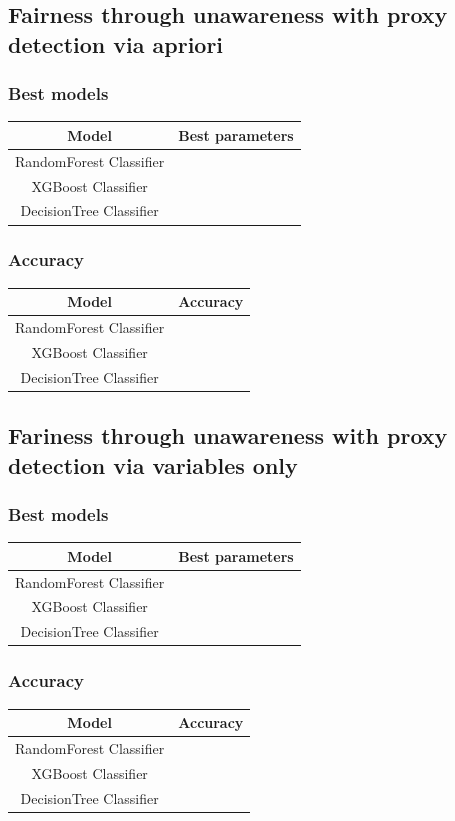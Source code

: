 \documentclass[12pt,a4paper,openright,twoside]{book}
\begin{document}
\subsection{Fairness through unawareness with proxy detection via apriori}
\subsubsection{Best models}
\begin{tabular}{|c|c|}
    \hline
    \textbf{Model} & \textbf{Best parameters} \\
    \hline
    RandomForest Classifier  &  \\
    \hline
    XGBoost Classifier & \\
    \hline
    DecisionTree Classifier &  \\
    \hline
\end{tabular}

\subsubsection{Accuracy} 
\begin{tabular}{|c|c|}
    \hline
    \textbf{Model} & \textbf{Accuracy} \\ 
    \hline
    RandomForest Classifier  &  \\
    \hline
    XGBoost Classifier & \\
    \hline
    DecisionTree Classifier & \\ 
    \hline
\end{tabular}

\subsection{Fariness through unawareness with proxy detection via variables only}
\subsubsection{Best models}
\begin{tabular}{|c|c|}
    \hline
    \textbf{Model} & \textbf{Best parameters} \\
    \hline
    RandomForest Classifier  &  \\
    \hline
    XGBoost Classifier & \\
    \hline
    DecisionTree Classifier & \\ 
    \hline
\end{tabular}

\subsubsection{Accuracy}
\begin{tabular}{|c|c|}
    \hline
    \textbf{Model} & \textbf{Accuracy} \\ 
    \hline
    RandomForest Classifier  &  \\
    \hline
    XGBoost Classifier & \\
    \hline
    DecisionTree Classifier & \\ 
    \hline
\end{tabular}
\end{document}
